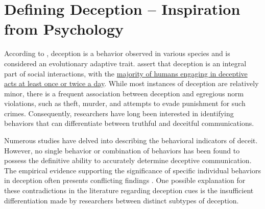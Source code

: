 \vspace{-4mm}
\section{Defining Deception -- Inspiration from Psychology}

According to \cite{schuiling2004deceive}, deception is a behavior observed in various species and is considered an evolutionary adaptive trait. \cite{depaulo1998everyday}  assert that deception is an integral part of social interactions, with the \ul{majority of humans engaging in deceptive acts at least once or twice a day}. While most instances of deception are relatively minor, there is a frequent association between deception and egregious norm violations, such as theft, murder, and attempts to evade punishment for such crimes. Consequently, researchers have long been interested in identifying behaviors that can differentiate between truthful and deceitful communications.

Numerous studies have delved into describing the behavioral indicators of deceit. However, no single behavior or combination of behaviors has been found to possess the definitive ability to accurately determine deceptive communication. %
The empirical evidence supporting the significance of specific individual behaviors in deception often presents conflicting findings \cite{depaulo1985deceiving, kraut1980humans, vrij2000detecting}. One possible explanation for these contradictions in the literature regarding deception cues is the insufficient differentiation made by researchers between distinct subtypes of deception.

